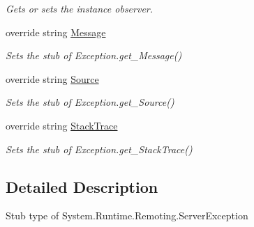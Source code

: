 \begin{DoxyCompactItemize}
\begin{DoxyCompactList}\small\item\em Gets or sets the instance observer.\end{DoxyCompactList}\item 
override string \hyperlink{class_system_1_1_runtime_1_1_remoting_1_1_fakes_1_1_stub_server_exception_a1535cd58ad810b48d3b21e6630c278fa}{Message}
\begin{DoxyCompactList}\small\item\em Sets the stub of Exception.\-get\-\_\-\-Message()\end{DoxyCompactList}\item 
override string \hyperlink{class_system_1_1_runtime_1_1_remoting_1_1_fakes_1_1_stub_server_exception_aaf07a00514aba6020948a3b00747ad44}{Source}
\begin{DoxyCompactList}\small\item\em Sets the stub of Exception.\-get\-\_\-\-Source()\end{DoxyCompactList}\item 
override string \hyperlink{class_system_1_1_runtime_1_1_remoting_1_1_fakes_1_1_stub_server_exception_ab68fc93c3f4b5c201b0fbfab8e5bb406}{Stack\-Trace}
\begin{DoxyCompactList}\small\item\em Sets the stub of Exception.\-get\-\_\-\-Stack\-Trace()\end{DoxyCompactList}\end{DoxyCompactItemize}


\subsection{Detailed Description}
Stub type of System.\-Runtime.\-Remoting.\-Server\-Exception



